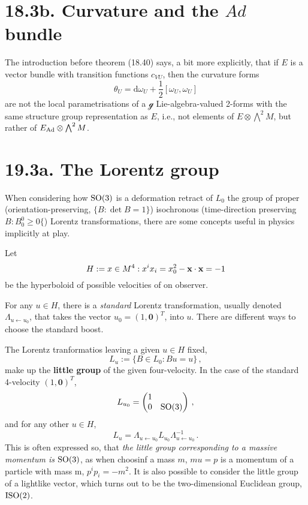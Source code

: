 \documentclass[a4paper,12pt]{article}
\def\d{\mathrm{d}}
\begin{document}
\section*{18.3b. Curvature and the $Ad$ bundle}
The introduction before theorem (18.40) says, a bit more explicitly, that if $E$ is a vector bundle with transition functions $c_{VU}$, then the curvature forms
\[
 \theta_U = \d \omega_U + \frac{1}{2}[\omega_U, \omega_U]
\]
are not the local parametrisations of a $\mathcal{g}$ Lie-algebra-valued 2-forms with the same structure group representation as $E$, i.e., not elements of $E\otimes \bigwedge^2 M$, but rather of $E_{\rm Ad}\otimes \bigwedge^2 M$.

\section*{19.3a. The Lorentz group}

When considering how ${\rm SO}(3)$ is a deformation retract of $L_0$ the group of proper (orientation-preserving, $\{B: \det B = 1\}$) isochronous (time-direction preserving $B: B^0_0 \ge 0\{$) Lorentz transformations, there are some concepts useful in physics implicitly at play.

Let
\[
 H := {x \in M^4 : x^ix_i = x_0^2 - {\bf x}\cdot{\bf x} = -1}
\]
be the hyperboloid of possible velocities of on observer.

For any $u\in H$, there is a {\sl standard}\/ Lorentz transformation, usually denoted $\Lambda_{u \leftarrow u_0}$, that takes the vector $u_0=(1, \boldsymbol 0)^T$, into $u$. There are different ways to choose the standard boost.

The Lorentz tranformatios leaving a given $u\in H$ fixed,
\[
 L_u := \{B\in L_0: Bu = u\}\,,
\]
make up the {\bf little group} of the given four-velocity. In the case of the standard 4-velocity $(1, \boldsymbol 0)^T$,
\[
 L_{u_0} = \begin{pmatrix} 1 & \\ 0 & {\rm SO}(3) \end{pmatrix}\,,
\]
and for any other $u\in H$,
\[
 L_u = \Lambda_{u\leftarrow u_0}L_{u_0}\Lambda_{u\leftarrow u_0}^{-1}\,.
\]
This is often expressed so, that {\sl the little group corresponding to a massive momentum is ${\rm SO}(3)$}, as when choosinf a mass $m$, $m u =p$ is a momentum of a particle with mass m, $p^ip_i = -m^2$. It is also possible to consider the little group of a lightlike vector, which turns out to be the two-dimensional Euclidean group, ${\rm ISO}(2)$.
\end{document}
